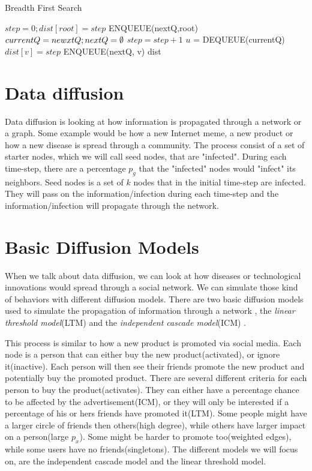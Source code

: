 \begin{algorithm}
\caption{Breadth First Search}
\begin{algorithmic}[1]
\State $step = 0; dist[root] = step$
\State ENQUEUE(nextQ,root)
\State $currentQ = newxtQ; nextQ = \emptyset$
\State $step = step+1$
\State$ u$ = DEQUEUE(currentQ)
\State $dist[v] = step$
\State ENQUEUE(nextQ, v)
\EndIf
\EndFor
\EndWhile
\EndWhile
\Return dist
\end{algorithmic}
\end{algorithm}



\section{Data diffusion}
Data diffusion is looking at how information is propagated through a network or a graph. Some example would be how a new Internet meme, a new product or how a new disease is spread through a community. The process consist of a set of starter nodes, which we will call seed nodes, that are "infected". During each time-step, there are a percentage $p_g$ that the "infected" nodes would "infect" its neighbors. Seed nodes is a set of $k$ nodes that in the initial time-step are infected. They will pass on the information/infection during each time-step and the information/infection will propagate through the network. 
 
\section{Basic Diffusion Models}
When we talk about data diffusion, we can look at how diseases or technological innovations would spread through a social network. We can simulate those kind of behaviors with different diffusion models. There are two basic diffusion models used to simulate the propagation of information through a network \cite{MaximizeSpread2003}, the \textit{linear threshold model}(LTM) and the \textit{independent cascade model}(ICM) \cite{MaximizeSpread2003}.

This process is similar to how a new product is promoted via social media. Each node is a person that can either buy the new product(activated), or ignore it(inactive). Each person will then see their friends promote the new product and potentially buy the promoted product. There are several different criteria for each person to buy the product(activates). They can either have a percentage chance to be affected by the advertisement(ICM), or they will only be interested if a percentage of his or hers friends have promoted it(LTM). Some people might have a larger circle of friends then others(high degree), while others have larger impact on a person(large $p_x$). Some might be harder to promote too(weighted edges), while some users have no friends(singletons). The different models we will focus on, are the independent cascade model and the linear threshold model.

